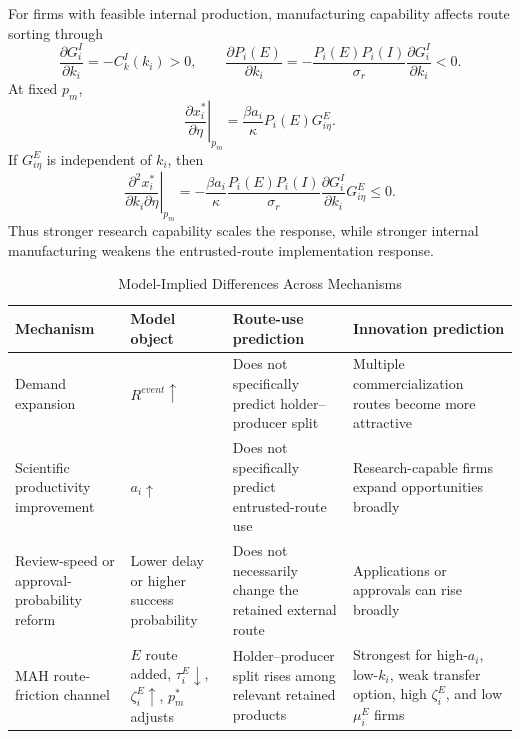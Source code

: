 \documentclass[12pt]{article}
\newcommand{\1}{\mathbf{1}}
\begin{document}
For firms with feasible internal production, manufacturing capability affects route sorting through
\begin{equation}
    \frac{\partial G_i^I}{\partial k_i}=-C_k^I(k_i)>0,
    \qquad
    \frac{\partial P_i(E)}{\partial k_i}
    =-\frac{P_i(E)P_i(I)}{\sigma_r}
      \frac{\partial G_i^I}{\partial k_i}<0.
    \label{eq:dPEdk_appendix}
\end{equation}
At fixed $p_m$,
\begin{equation}
    \left.\frac{\partial x_i^*}{\partial\eta}\right|_{p_m}
    =\frac{\beta a_i}{\kappa}P_i(E)G_{i\eta}^E.
    \label{eq:direct_x_eta_appendix}
\end{equation}
If $G_{i\eta}^E$ is independent of $k_i$, then
\begin{equation}
    \left.\frac{\partial^2 x_i^*}{\partial k_i\partial\eta}\right|_{p_m}
    =-\frac{\beta a_i}{\kappa}
      \frac{P_i(E)P_i(I)}{\sigma_r}
      \frac{\partial G_i^I}{\partial k_i}G_{i\eta}^E\le0.
    \label{eq:cross_k_eta}
\end{equation}
Thus stronger research capability scales the response, while stronger internal manufacturing weakens the entrusted-route implementation response.

\begin{table}[htbp]
\centering
\scriptsize
\caption{Model-Implied Differences Across Mechanisms}
\label{tab:alternative_mechanisms}
\begin{tabularx}{\textwidth}{@{}L{0.22\textwidth}L{0.20\textwidth}L{0.27\textwidth}Y@{}}
\toprule
Mechanism & Model object & Route-use prediction & Innovation prediction \\
\midrule
Demand expansion & $R^{event}\uparrow$ & Does not specifically predict holder--producer split & Multiple commercialization routes become more attractive \\
Scientific productivity improvement & $a_i\uparrow$ & Does not specifically predict entrusted-route use & Research-capable firms expand opportunities broadly \\
Review-speed or approval-probability reform & Lower delay or higher success probability & Does not necessarily change the retained external route & Applications or approvals can rise broadly \\
MAH route-friction channel & $E$ route added, $\tau_i^E\downarrow$, $\zeta_i^E\uparrow$, $p_m^*$ adjusts & Holder--producer split rises among relevant retained products & Strongest for high-$a_i$, low-$k_i$, weak transfer option, high $\zeta_i^E$, and low $\mu_i^E$ firms \\
\bottomrule
\end{tabularx}
\end{table}
\end{document}
